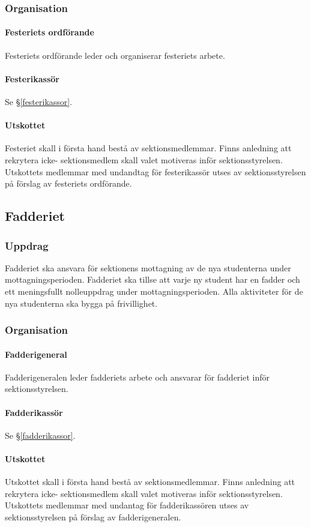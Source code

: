 \documentclass{datateknologsektionen-document}
\begin{document}
\subsubsection{Organisation}
\paragraph{Festeriets ordförande}
Festeriets ordförande leder och organiserar festeriets arbete.
\paragraph{Festerikassör}
Se \S \ref{festerikassor}.
\paragraph{Utskottet}
Festeriet skall i första hand bestå av sektionsmedlemmar. Finns anledning att rekrytera icke-
sektionsmedlem skall valet motiveras inför sektionsstyrelsen. Utskottets medlemmar med undandtag för festerikassör utses av sektionsstyrelsen på förslag av festeriets ordförande.

\subsection{Fadderiet}
\label{fadderiet}
\subsubsection{Uppdrag}
Fadderiet ska ansvara för sektionens mottagning av de nya studenterna under
mottagningsperioden. Fadderiet ska tillse att varje ny student har en fadder och ett meningsfullt
nolleuppdrag under mottagningsperioden. Alla aktiviteter för de nya studenterna ska bygga på
frivillighet.
\subsubsection{Organisation}
\paragraph{Fadderigeneral}
Fadderigeneralen leder fadderiets arbete och ansvarar för fadderiet inför sektionsstyrelsen.
\paragraph{Fadderikassör}
Se \S \ref{fadderikassor}.
\paragraph{Utskottet}
Utskottet skall i första hand bestå av sektionsmedlemmar. Finns anledning att rekrytera icke-
sektionsmedlem skall valet motiveras inför sektionsstyrelsen. Utskottets medlemmar med
undantag för fadderikassören utses av sektionsstyrelsen på förslag av fadderigeneralen.
\end{document}
